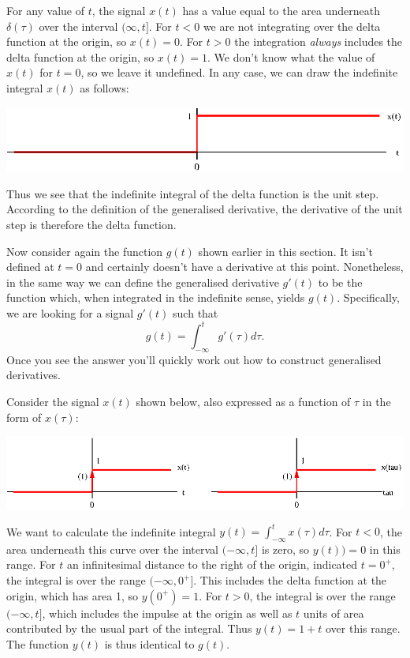 \documentclass[10pt]{beamer}
\begin{document}
For any value of $t$, the signal $x(t)$ has a value equal to the area underneath $\delta(\tau)$ over the interval $(\infty, t]$.  For $t<0$ we are not integrating over the delta function at the origin, so $x(t) = 0$.  For $t>0$ the integration {\em always} includes the delta function at the origin, so $x(t) = 1$.  We don't know what the value of $x(t)$ for $t=0$, so we leave it undefined.  In any case, we can draw the indefinite integral $x(t)$ as follows:
\begin{center}
  \includegraphics{unitstep3}
\end{center}
Thus we see that the indefinite integral of the delta function is the unit step.  According to the definition of the generalised derivative, the derivative of the unit step is therefore the delta function.

Now consider again the function $g(t)$ shown earlier in this section.  It isn't defined at $t=0$ and certainly doesn't have a derivative at this point.  Nonetheless, in the same way we can define the generalised derivative $g'(t)$ to be the function which, when integrated in the indefinite sense, yields $g(t)$.  Specifically, we are looking for a signal $g'(t)$ such that
\begin{equation*}
  g(t) = \int_{-\infty}^t g'(\tau) d\tau.
\end{equation*}
Once you see the answer you'll quickly work out how to construct generalised derivatives.  

Consider the signal $x(t)$ shown below, also expressed as a function of $\tau$ in the form of $x(\tau)$:
\begin{center}
  \includegraphics{genderivex2}
\end{center}
We want to calculate the indefinite integral $y(t) = \int_{-\infty}^t x(\tau) d\tau$.  For $t<0$, the area underneath this curve over the interval $(-\infty,t]$ is zero, so $y(t)) = 0$ in this range.  For $t$ an infinitesimal distance to the right of the origin, indicated $t = 0^+$, the integral is over the range $(-\infty,0^+]$.  This includes the delta function at the origin, which has area 1, so $y(0^+) = 1$.  For $t>0$, the integral is over the range $(-\infty,t]$, which includes the impulse at the origin as well as $t$ units of area contributed by the usual part of the integral.  Thus $y(t) = 1 + t$ over this range.  The function $y(t)$ is thus identical to $g(t)$.  
\end{document}

